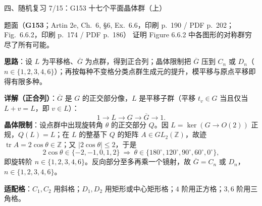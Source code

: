 \documentclass[aspectratio=169,10pt,fontset=none]{ctexbeamer}
\newcommand{\ex}[1]{\textcolor{accent}{\footnotesize\bfseries #1}}
\newcommand{\key}[1]{\textcolor{ink}{\bfseries #1}}
\begin{document}
\begin{frame}[t]{四、随机复习 7/15：G153 十七个平面晶体群（上）}
\label{ex:G153}
\scriptsize
\begin{block}{\footnotesize 题面（\ex{G153}；Artin 2e, Ch.~6, §6, Ex.~6.6，印刷 p.~190 / PDF p.~202；Fig.~6.6.2，印刷 p.~174 / PDF p.~186）}
证明 Figure 6.6.2 中各图形的对称群穷尽了所有可能。
\end{block}
\key{思路}：设 $L$ 为平移格、$\overline G$ 为点群，得到正合列；晶体限制把 $\overline G$ 压到 $C_n$ 或 $D_n$（$n\in\{1,2,3,4,6\}$）；再按每种不变格分类点群生成元的提升，模平移与原点平移即得有限多种。

\key{详解（正合列）}：$\overline G$ 是 $G$ 的正交部分像，$L$ 是平移子群（平移 $t_v\in G$ 当且仅当 $L+v=L$，即 $v\in L$）：
\[ 1\longrightarrow L\longrightarrow G\longrightarrow\overline G\longrightarrow 1. \]
\key{晶体限制}：设点群中出现旋转角 $\theta$ 的正交部分 $Q$。因 $L=\ker(G\to O(2))$ 正规，$Q(L)=L$；在 $L$ 的整基下 $Q$ 的矩阵 $A\in GL_2(\mathbb Z)$，故迹 $\operatorname{tr}A=2\cos\theta\in\mathbb Z$；又 $|2\cos\theta|\le2$，于是
\[ 2\cos\theta\in\{-2,-1,0,1,2\}\ \Longrightarrow\ \theta\in\{180^\circ,120^\circ,90^\circ,60^\circ,0^\circ\}, \]
即旋转阶 $n\in\{1,2,3,4,6\}$。反向部分至多再乘一个镜射，故 $\overline G=C_n$ 或 $D_n$，$n\in\{1,2,3,4,6\}$。

\key{适配格}：$C_1,C_2$ 用斜格；$D_1,D_2$ 用矩形或中心矩形格；$4$ 阶用正方格；$3,6$ 阶用三角格。
\end{frame}
\end{document}
